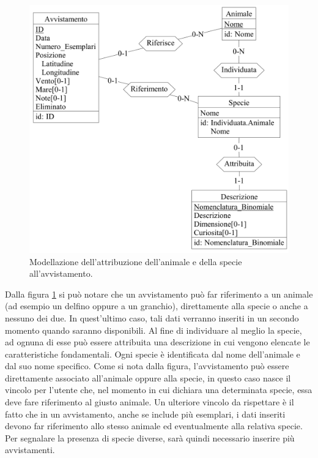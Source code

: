 \documentclass[a4paper,final,12pt]{report}
\begin{document}
\begin{figure}[hbtp]
\centering
\includegraphics[scale=0.10]{img_concettuale/avvistamento2.png}
\caption{Modellazione dell'attribuzione dell'animale e della specie all'avvistamento.}
\label{figura:avvanispedesc}
\end{figure}

Dalla figura \ref{figura:avvanispedesc} si può notare che un avvistamento può far riferimento a un animale (ad esempio un delfino oppure a un granchio), direttamente alla specie o anche a nessuno dei due. In quest'ultimo caso, tali dati verranno inseriti in un secondo momento quando saranno disponibili. Al fine di individuare al meglio la specie, ad ognuna di esse può essere attribuita una descrizione in cui vengono elencate le caratteristiche fondamentali. Ogni specie è identificata dal nome dell'animale e dal suo nome specifico. Come si nota dalla figura, l'avvistamento può essere direttamente associato all'animale oppure alla specie, in questo caso nasce il vincolo per l'utente che, nel momento in cui dichiara una determinata specie, essa deve fare riferimento al giusto animale. Un ulteriore vincolo da rispettare è il fatto che in un avvistamento, anche se include più esemplari, i dati inseriti devono far riferimento allo stesso animale ed eventualmente alla relativa specie. Per segnalare la presenza di specie diverse, sarà quindi necessario inserire più avvistamenti.
\end{document}
